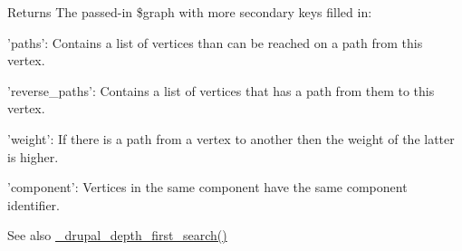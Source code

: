 \begin{DoxyReturn}{Returns}
The passed-\/in \$graph with more secondary keys filled in:
\begin{DoxyItemize}
\item 'paths': Contains a list of vertices than can be reached on a path from this vertex.
\item 'reverse\_\-paths': Contains a list of vertices that has a path from them to this vertex.
\item 'weight': If there is a path from a vertex to another then the weight of the latter is higher.
\item 'component': Vertices in the same component have the same component identifier.
\end{DoxyItemize}
\end{DoxyReturn}
\begin{DoxySeeAlso}{See also}
\hyperlink{graph_8inc_ac59acd453622f095c7861c3404b5c176}{\_\-drupal\_\-depth\_\-first\_\-search()} 
\end{DoxySeeAlso}
